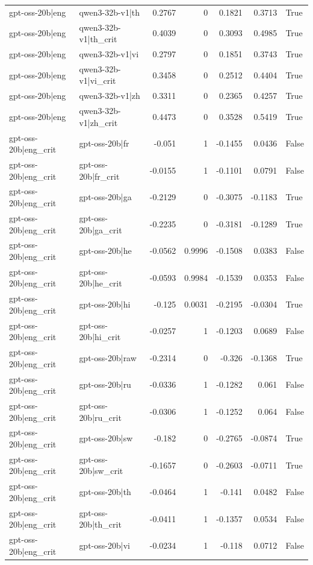 \begin{table}
\begin{tabular}{l l r r r r l}
gpt-oss-20b|eng & qwen3-32b-v1|th & 0.2767 & 0 & 0.1821 & 0.3713 & True \\
gpt-oss-20b|eng & qwen3-32b-v1|th_crit & 0.4039 & 0 & 0.3093 & 0.4985 & True \\
gpt-oss-20b|eng & qwen3-32b-v1|vi & 0.2797 & 0 & 0.1851 & 0.3743 & True \\
gpt-oss-20b|eng & qwen3-32b-v1|vi_crit & 0.3458 & 0 & 0.2512 & 0.4404 & True \\
gpt-oss-20b|eng & qwen3-32b-v1|zh & 0.3311 & 0 & 0.2365 & 0.4257 & True \\
gpt-oss-20b|eng & qwen3-32b-v1|zh_crit & 0.4473 & 0 & 0.3528 & 0.5419 & True \\
gpt-oss-20b|eng_crit & gpt-oss-20b|fr & -0.051 & 1 & -0.1455 & 0.0436 & False \\
gpt-oss-20b|eng_crit & gpt-oss-20b|fr_crit & -0.0155 & 1 & -0.1101 & 0.0791 & False \\
gpt-oss-20b|eng_crit & gpt-oss-20b|ga & -0.2129 & 0 & -0.3075 & -0.1183 & True \\
gpt-oss-20b|eng_crit & gpt-oss-20b|ga_crit & -0.2235 & 0 & -0.3181 & -0.1289 & True \\
gpt-oss-20b|eng_crit & gpt-oss-20b|he & -0.0562 & 0.9996 & -0.1508 & 0.0383 & False \\
gpt-oss-20b|eng_crit & gpt-oss-20b|he_crit & -0.0593 & 0.9984 & -0.1539 & 0.0353 & False \\
gpt-oss-20b|eng_crit & gpt-oss-20b|hi & -0.125 & 0.0031 & -0.2195 & -0.0304 & True \\
gpt-oss-20b|eng_crit & gpt-oss-20b|hi_crit & -0.0257 & 1 & -0.1203 & 0.0689 & False \\
gpt-oss-20b|eng_crit & gpt-oss-20b|raw & -0.2314 & 0 & -0.326 & -0.1368 & True \\
gpt-oss-20b|eng_crit & gpt-oss-20b|ru & -0.0336 & 1 & -0.1282 & 0.061 & False \\
gpt-oss-20b|eng_crit & gpt-oss-20b|ru_crit & -0.0306 & 1 & -0.1252 & 0.064 & False \\
gpt-oss-20b|eng_crit & gpt-oss-20b|sw & -0.182 & 0 & -0.2765 & -0.0874 & True \\
gpt-oss-20b|eng_crit & gpt-oss-20b|sw_crit & -0.1657 & 0 & -0.2603 & -0.0711 & True \\
gpt-oss-20b|eng_crit & gpt-oss-20b|th & -0.0464 & 1 & -0.141 & 0.0482 & False \\
gpt-oss-20b|eng_crit & gpt-oss-20b|th_crit & -0.0411 & 1 & -0.1357 & 0.0534 & False \\
gpt-oss-20b|eng_crit & gpt-oss-20b|vi & -0.0234 & 1 & -0.118 & 0.0712 & False \\

\end{tabular}
\end{table}
